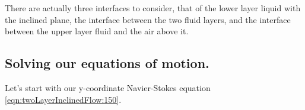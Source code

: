There are actually three interfaces to consider, that of the lower layer liquid with the inclined plane, the interface between the two fluid layers, and the interface between the upper layer fluid and the air above it.

\subsection{Solving our equations of motion.}

Let's start with our y-coordinate Navier-Stokes equation \ref{eqn:twoLayerInclinedFlow:150}.


\EndArticle
